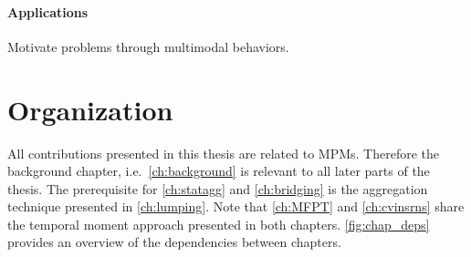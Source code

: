 \paragraph{Applications} Motivate problems through multimodal behaviors.

\section{Organization}
All contributions presented in this thesis are related to \aclp{MPM}.
Therefore the background chapter, i.e.\ \autoref{ch:background} is relevant
to all later parts of the thesis.
The prerequisite for \autoref{ch:statagg} and \autoref{ch:bridging} is the aggregation
technique presented in \autoref{ch:lumping}.
Note that \autoref{ch:MFPT} and \autoref{ch:cvinsrns} share the temporal moment approach presented
in both chapters.
\autoref{fig:chap_deps} provides an overview of the dependencies between chapters.
